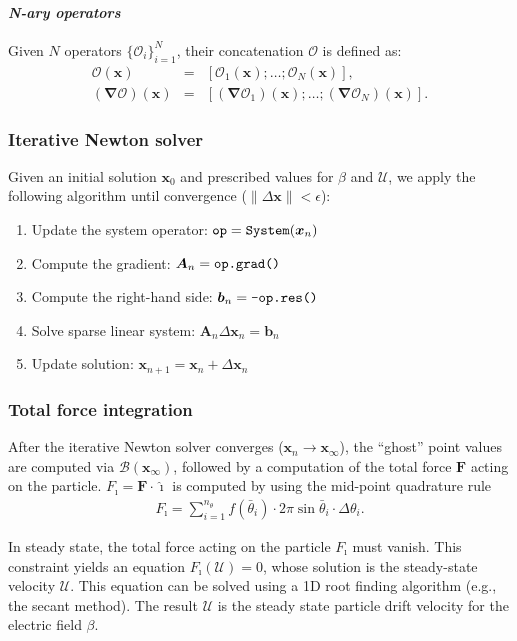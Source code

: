 \documentclass[10pt]{ijnam}
\newcommand\eps \epsilon
\newcommand\bnabla{\boldsymbol{\nabla}}
\newcommand\bF{\boldsymbol{F}}
\newcommand\bx{\boldsymbol{x}}
\newcommand\cB{\mathcal{B}}
\newcommand\cO{\mathcal{O}}
\newcommand\cU{\mathscr{U}}
\newcommand\ui{\boldsymbol{\hat{\imath}}}
\begin{document}
\paragraph{\textit{N-ary operators}}
Given $N$ operators $\{\cO_i\}_{i=1}^N$, their concatenation $\cO$ is defined as:
\begin{eqnarray*}
\cO(\bx) &=& [\cO_1(\bx); \ldots; \cO_N(\bx)], \\
(\bnabla\cO)(\bx) &=& [(\bnabla\cO_1)(\bx); \ldots; (\bnabla\cO_N)(\bx)].
\end{eqnarray*}

\subsubsection{Iterative Newton solver}
Given an initial solution $\bx_0$ and prescribed values for $\beta$ and $\cU$, 
we apply the following algorithm 
until convergence ($\|\Delta \bx\| < \eps$):
\begin{enumerate}
\item Update the system operator: $\verb|op| = \verb|System|(\bx_{n})$
\item Compute the gradient: $\boldsymbol{A}_n = \verb|op.grad()|$
\item Compute the right-hand side: $\boldsymbol{b}_n = \verb|-op.res()|$
\item Solve sparse linear system: $\boldsymbol{A}_n \Delta \bx_n = \boldsymbol{b}_n$
\item Update solution: $\bx_{n+1} = \bx_{n} + \Delta \bx_{n}$
\end{enumerate}

\subsubsection{Total force integration}
After the iterative Newton solver converges ($\bx_n \rightarrow \bx_\infty$), 
the ``ghost'' point values are computed via $\cB(\bx_\infty)$,
followed by a computation of the total force $\bF$ acting on the particle.
$F_\imath = \bF \cdot \ui$ is computed by using the mid-point quadrature rule
\begin{eqnarray*}
F_\imath = \sum_{i=1}^{n_\theta} f(\bar\theta_i) \cdot 
              2 \pi \sin\bar\theta_i \cdot \Delta\theta_i.
\end{eqnarray*}

In steady state, the total force acting on the particle $F_\imath$ must vanish.
This constraint yields an equation $F_\imath(\cU) = 0$, 
whose solution is the steady-state velocity $\cU$.
This equation can be solved using a 1D root finding algorithm (e.g., the secant method). The result $\cU$ is the 
steady state particle drift velocity for the electric field $\beta$.
\end{document}
